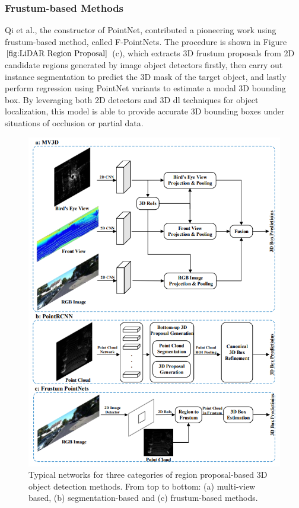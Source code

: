 \subsubsection{Frustum-based Methods}
Qi et al., the constructor of PointNet, contributed a pioneering work using frustum-based method, called F-PointNets\cite{qi_frustum_2018}. The procedure is shown in Figure \(\ref{fig:LiDAR Region Proposal}\) (c), which extracts 3D frustum proposals from 2D candidate regions generated by image object detectors firstly, then carry out instance segmentation to predict the 3D mask of the target object, and lastly perform regression using PointNet variants to estimate a modal 3D bounding box. By leveraging both 2D detectors and 3D \acrshort{dl} techniques for object localization, this model is able to provide accurate 3D bounding boxes under situations of occlusion or partial data. 

\begin{figure}[!htbp]
\centering
\includegraphics[scale=0.7]{Graphics/LiDAR Region Proposal.png}
\caption{Typical networks for three categories of region proposal-based 3D object detection methods.\cite{guo_deep_2020} From top to bottom: (a) multi-view based, (b) segmentation-based and (c) frustum-based methods.}
\label{fig:LiDAR Region Proposal}
\end{figure}

